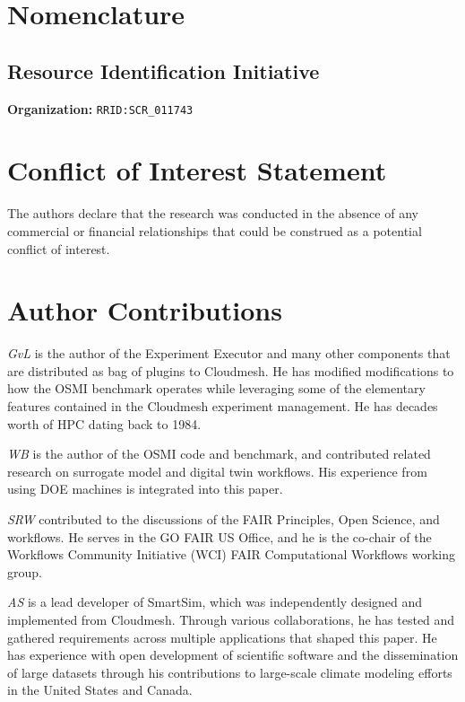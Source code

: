 \documentclass[sigconf]{acmart}
\begin{document}
\section{Nomenclature}

\subsection{Resource Identification Initiative}

{\bf Organization:} \verb|RRID:SCR_011743|

\section*{Conflict of Interest Statement}

The authors declare that the research was conducted in the absence of any commercial or financial relationships that could be construed as a potential conflict of interest.

\section*{Author Contributions}

{\em GvL} is the author of the Experiment Executor and many other components that are distributed as bag of plugins to Cloudmesh.  He has modified modifications to how the OSMI benchmark operates while leveraging some of the elementary features contained in the Cloudmesh experiment management. He has decades worth of HPC dating back to 1984. 

{\em WB} is the author of the OSMI code and benchmark, and contributed related research on surrogate model and digital twin workflows. His experience from using DOE machines is integrated into this paper.

{\em SRW} contributed to the discussions of the FAIR Principles, Open Science, and workflows. He serves in the GO FAIR US Office, and he is the co-chair of the Workflows Community Initiative (WCI) FAIR Computational Workflows working group.

{\em AS} is a lead developer of SmartSim, which was independently designed and implemented from Cloudmesh. Through various collaborations, he has tested and gathered requirements across multiple applications that shaped this paper. He has experience with open development of scientific software and the dissemination of large datasets through his contributions to large-scale climate modeling efforts in the United States and Canada. 
\end{document}
